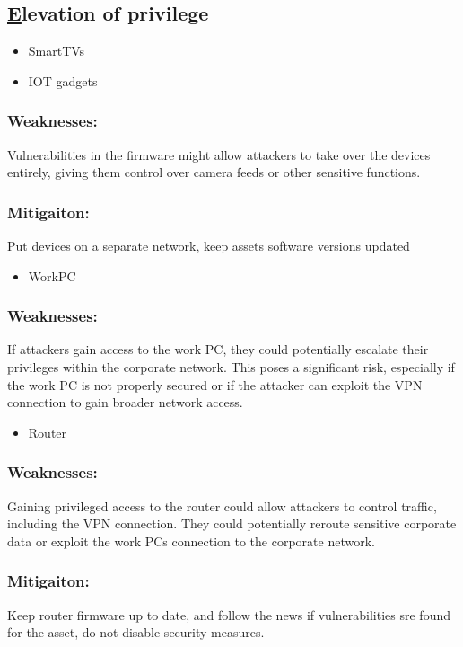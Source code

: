 \documentclass[
	letterpaper, %
	10pt, %
	unnumberedsections, %
	twoside, %
]{APAAssignment}
\begin{document}
\begin{singlespace}
\subsection{\underline{E}levation of privilege} 



	\begin{itemize}
		\item SmartTVs
		\item IOT gadgets 
	\end{itemize}
	
	\subsubsection{Weaknesses:} Vulnerabilities in the firmware might allow attackers to take over the devices entirely, giving them control over camera feeds or other sensitive functions.
	\subsubsection{Mitigaiton:} Put devices on a separate network, keep assets software versions updated
	
	\begin{itemize}
		\item WorkPC
	\end{itemize}
	
	\subsubsection{Weaknesses:} If attackers gain access to the work PC, they could potentially escalate their privileges within the corporate network. This poses a significant risk, especially if the work PC is not properly secured or if the attacker can exploit the VPN connection to gain broader network access.

	\begin{itemize}
		\item Router
	\end{itemize}
	
	\subsubsection{Weaknesses:} Gaining privileged access to the router could allow attackers to control traffic, including the VPN connection. They could potentially reroute sensitive corporate data or exploit the work PCs connection to the corporate network.
	\subsubsection{Mitigaiton:} Keep router firmware up to date, and follow the news if vulnerabilities sre found for the asset, do not disable security measures.
	
	
\end{singlespace}
\end{document}
